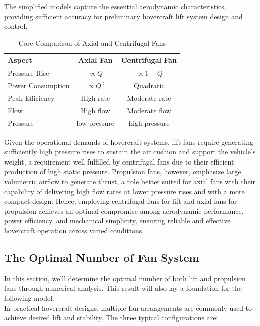 The simplified models capture the essential aerodynamic characteristics, providing sufficient accuracy for preliminary hovercraft lift system design and control.

\begin{table}[htbp]
  \centering
  \footnotesize
  \setlength{\tabcolsep}{4pt}
  \begin{tabular}{|l|c|c|}
    \hline
    \textbf{Aspect} & \textbf{Axial Fan} & \textbf{Centrifugal Fan} \\
    \hline
    Pressure Rise & \( \propto Q \) & \( \propto 1 - Q \)\\
    Power Consumption & \( \propto Q^2 \) & Quadratic\\
    Peak Efficiency & High rate & Moderate rate \\
    Flow & High flow & Moderate flow \\
    Pressure & low pressure & high pressure \\
    \hline
  \end{tabular}
  \caption{Core Comparison of Axial and Centrifugal Fans}
  \label{tab:fan_core_comparison}
\end{table}

Given the operational demands of hovercraft systems, lift fans require generating sufficiently high pressure rises to sustain the air cushion and support the vehicle’s weight, a requirement well fulfilled by centrifugal fans due to their efficient production of high static pressure. Propulsion fans, however, emphasize large volumetric airflow to generate thrust, a role better suited for axial fans with their capability of delivering high flow rates at lower pressure rises and with a more compact design. Hence, employing centrifugal fans for lift and axial fans for propulsion achieves an optimal compromise among aerodynamic performance, power efficiency, and mechanical simplicity, ensuring reliable and effective hovercraft operation across varied conditions.

\subsection{The Optimal Number of Fan System}
In this section, we'll determine the optimal number of both lift and propulsion fans through numerical analysis. This result will also lay a foundation for the following model.\\

In practical hovercraft designs, multiple fan arrangements are commonly used to achieve desired lift and stability. The three typical configurations are:

